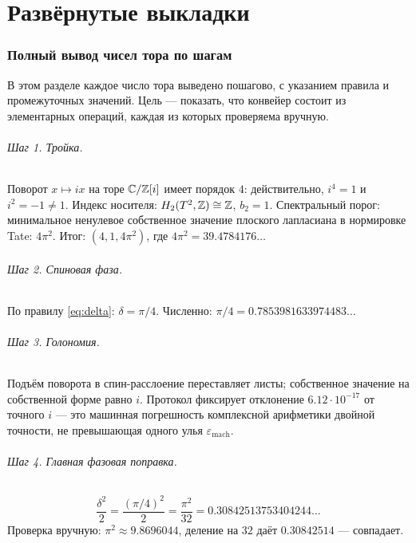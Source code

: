 \part{Развёрнутые выкладки}

\section{Полный вывод чисел тора по шагам}\label{sec:worktorus}

В этом разделе каждое число тора выведено пошагово, с указанием
правила и промежуточных значений. Цель --- показать, что конвейер
состоит из элементарных операций, каждая из которых проверяема
вручную.

\paragraph{Шаг 1. Тройка.} Поворот $x\mapsto ix$ на торе
$\mathbb{C}/\mathbb{Z}[i]$ имеет порядок $4$: действительно, $i^4=1$ и $i^2=-1\ne1$.
Индекс носителя: $H_2(T^2,\mathbb{Z})\cong\mathbb{Z}$, $b_2=1$. Спектральный порог:
минимальное ненулевое собственное значение плоского лапласиана в
нормировке Tate: $4\pi^2$. Итог: $(4,1,4\pi^2)$, где
$4\pi^2=39.4784176\ldots$

\paragraph{Шаг 2. Спиновая фаза.} По правилу \eqref{eq:delta}:
$\delta=\pi/4$. Численно: $\pi/4=0.7853981633974483\ldots$

\paragraph{Шаг 3. Голономия.} Подъём поворота в спин-расслоение
переставляет листы; собственное значение на собственной форме равно
$i$. Протокол фиксирует отклонение $6.12\cdot10^{-17}$ от точного
$i$ --- это машинная погрешность комплексной арифметики двойной
точности, не превышающая одного улья $\varepsilon_{\text{mach}}$.

\paragraph{Шаг 4. Главная фазовая поправка.}
\[
  \frac{\delta^2}{2}=\frac{(\pi/4)^2}{2}
  =\frac{\pi^2}{32}=0.30842513753404244\ldots
\]
Проверка вручную: $\pi^2\approx9.8696044$, деление на $32$ даёт
$0.30842514$ --- совпадает.

